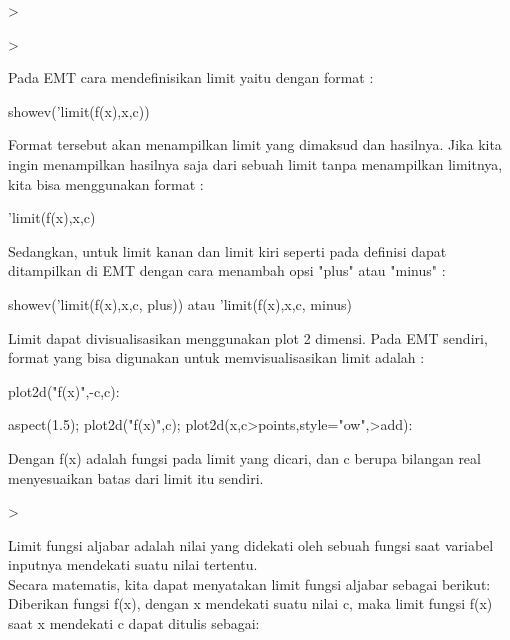 \documentclass[a4paper,10pt]{article}
\begin{document}
\begin{eulernotebook}
\begin{eulercomment}
\begin{eulercomment}
\begin{eulercomment}
\begin{eulercomment}
\begin{eulercomment}
\begin{eulerudf}
\end{eulerudf}
\begin{eulerprompt}
>    
\end{eulerprompt}
\begin{eulerudf}
   
\end{eulerudf}
\begin{eulerprompt}
> 
\end{eulerprompt}
\begin{eulercomment}
Pada EMT cara mendefinisikan limit yaitu dengan format :

\textdollar{}showev('limit(f(x),x,c))

Format tersebut akan menampilkan limit yang dimaksud dan hasilnya.
Jika kita ingin menampilkan hasilnya saja dari sebuah limit tanpa
menampilkan limitnya, kita bisa menggunakan format :

'limit(f(x),x,c)

Sedangkan, untuk limit kanan dan limit kiri seperti pada definisi
dapat ditampilkan di EMT dengan cara menambah opsi "plus" atau "minus"
:

\textdollar{}showev('limit(f(x),x,c, plus)) atau 'limit(f(x),x,c, minus)

Limit dapat divisualisasikan menggunakan plot 2 dimensi. Pada EMT
sendiri, format yang bisa digunakan untuk memvisualisasikan limit
adalah :

plot2d("f(x)",-c,c):

aspect(1.5); plot2d("f(x)",c); plot2d(x,c\textgreater{}points,style="ow",\textgreater{}add):

Dengan f(x) adalah fungsi pada limit yang dicari, dan c berupa
bilangan real menyesuaikan batas dari limit itu sendiri.
\end{eulercomment}
\begin{eulerprompt}
>               
\end{eulerprompt}
\begin{eulercomment}
Limit fungsi aljabar adalah nilai yang didekati oleh sebuah fungsi
saat variabel inputnya mendekati suatu nilai tertentu.\\
Secara matematis, kita dapat menyatakan limit fungsi aljabar sebagai
berikut:\\
Diberikan fungsi f(x), dengan x mendekati suatu nilai c, maka limit
fungsi f(x) saat x mendekati c dapat ditulis sebagai:


\end{eulercomment}
\end{eulercomment}
\end{eulercomment}
\end{eulercomment}
\end{eulercomment}
\end{eulercomment}
\end{eulernotebook}
\end{document}
